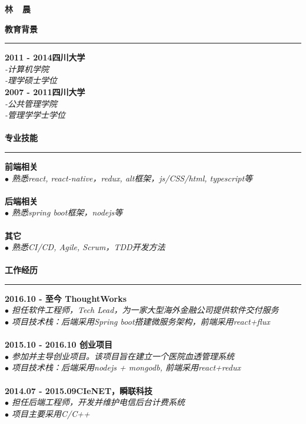 \documentclass[a4paper,12pt,final]{memoir}
\newcommand{\myThemeColor}{RoyalBlue}
\newcommand{\SmallSep}{\vspace{0.9em}}
\newcommand{\CVSection}[1]
	{\Large\textbf{#1}\par
	\vspace{0.2cm}\normalsize\normalfont}
\newcommand{\CVItem}[1]
	{\textbf{\color{\myThemeColor} #1}}
\begin{document}
\begin{CJK*}{UTF8}{gbsn}
\Huge\bfseries {\color{\myThemeColor} 林~~晨}\\
\normalsize\normalfont

\CVSection{教育背景}
\hrule
\SmallSep
\CVItem{2011 - 2014\hfill\textsc{四川大学}}\\
\textit{-计算机学院}\\
\textit{-理学硕士学位}
\\
\CVItem{2007 - 2011\hfill\textsc{四川大学}}\\
\textit{-公共管理学院}\\
\textit{-管理学学士学位}\\
\\
\CVSection{专业技能}
\hrule
\SmallSep
\CVItem{前端相关}\\
\textit{$\bullet$ 熟悉react, react-native，redux, alt框架，js/CSS/html, typescript等} \\
\\
\CVItem{后端相关}\\
\textit{$\bullet$ 熟悉spring boot框架，nodejs等} \\
\\
\CVItem{其它}\\
\textit{$\bullet$ 熟悉CI/CD, Agile, Scrum，TDD开发方法 }\\
\\

\CVSection{工作经历}
\hrule
\SmallSep
\CVItem{2016.10 - 至今 \hfill ThoughtWorks}\\
\textit{$\bullet$ 担任软件工程师，Tech Lead，为一家大型海外金融公司提供软件交付服务} \\
\textit{$\bullet$ 项目技术栈：后端采用Spring boot搭建微服务架构，前端采用react+flux} \\
\\
\CVItem{2015.10 - 2016.10 \hfill 创业项目}\\
\textit{$\bullet$ 参加并主导创业项目。该项目旨在建立一个医院血透管理系统} \\
\textit{$\bullet$ 项目技术栈：后端采用nodejs + mongodb, 前端采用react+redux} \\
\\
\CVItem{2014.07 - 2015.09\hfill CIeNET，瞬联科技}\\
\textit{$\bullet$ 担任后端工程师，开发并维护电信后台计费系统} \\
\textit{$\bullet$ 项目主要采用C/C++} \\


\end{CJK*}
\end{document}
